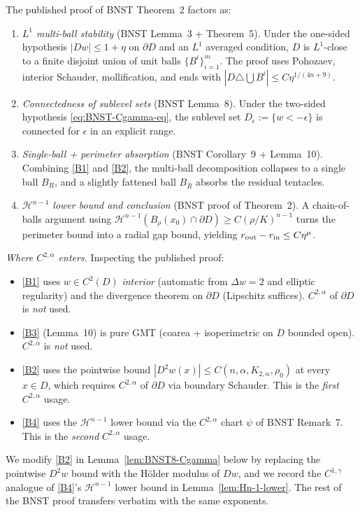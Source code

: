 \documentclass[11pt]{amsart}
\begin{document}
The published proof of BNST Theorem~2 \cite{BNST} factors as:
\begin{enumerate}[label=\textup{(B\arabic*)}]
\item\label{B1} \emph{$L^1$ multi-ball stability} (BNST Lemma~3 +
Theorem~5).  Under the one-sided hypothesis $|Dw|\le 1+\eta$ on
$\partial D$ and an $L^1$ averaged condition, $D$ is $L^1$-close to a
finite disjoint union of unit balls $\{B^i\}_{i=1}^m$.  The proof
uses Pohozaev, interior Schauder, mollification, and ends with
$|D\triangle\bigcup B^i|\le C\eta^{1/(4n+9)}$.
\item\label{B2} \emph{Connectedness of sublevel sets} (BNST Lemma~8).
Under the two-sided hypothesis \eqref{eq:BNST-Cgamma-eq}, the
sublevel set $D_\epsilon:=\{w<-\epsilon\}$ is connected for
$\epsilon$ in an explicit range.
\item\label{B3} \emph{Single-ball + perimeter absorption} (BNST
Corollary~9 + Lemma~10).  Combining \ref{B1} and \ref{B2}, the
multi-ball decomposition collapses to a single ball $B_R$, and a
slightly fattened ball $B_{\bar R}$ absorbs the residual tentacles.
\item\label{B4} \emph{$\mathcal H^{n-1}$ lower bound and conclusion}
(BNST proof of Theorem~2).  A chain-of-balls argument using
$\mathcal H^{n-1}(B_\rho(x_0)\cap\partial D)\ge C(\rho/K)^{n-1}$
turns the perimeter bound into a radial gap bound, yielding
$r_{\rm out}-r_{\rm in}\le C\eta^{\mu}$.
\end{enumerate}

\emph{Where $C^{2,\alpha}$ enters.}  Inspecting the published proof:
\begin{itemize}
\item \ref{B1} uses $w\in C^2(D)$ \emph{interior} (automatic from
$\Delta w=2$ and elliptic regularity) and the divergence theorem on
$\partial D$ (Lipschitz suffices).  $C^{2,\alpha}$ of $\partial D$ is
\emph{not} used.
\item \ref{B3} (Lemma~10) is pure GMT (coarea + isoperimetric on
$D$ bounded open).  $C^{2,\alpha}$ is \emph{not} used.
\item \ref{B2} uses the pointwise bound $|D^2 w(x)|\le
C(n,\alpha,K_{2,\alpha},\rho_0)$ at every $x\in D$, which requires
$C^{2,\alpha}$ of $\partial D$ via boundary Schauder.  This is the
\emph{first} $C^{2,\alpha}$ usage.
\item \ref{B4} uses the $\mathcal H^{n-1}$ lower bound via the
$C^{2,\alpha}$ chart $\psi$ of BNST Remark~7.  This is the
\emph{second} $C^{2,\alpha}$ usage.
\end{itemize}
We modify \ref{B2} in
Lemma~\ref{lem:BNST8-Cgamma} below by replacing the pointwise
$D^2 w$ bound with the Hölder modulus of $Dw$, and we record the
$C^{1,\gamma}$ analogue of \ref{B4}'s $\mathcal H^{n-1}$ lower bound
in Lemma~\ref{lem:Hn-1-lower}.  The rest of the BNST proof transfers
verbatim with the same exponents.
\end{document}
